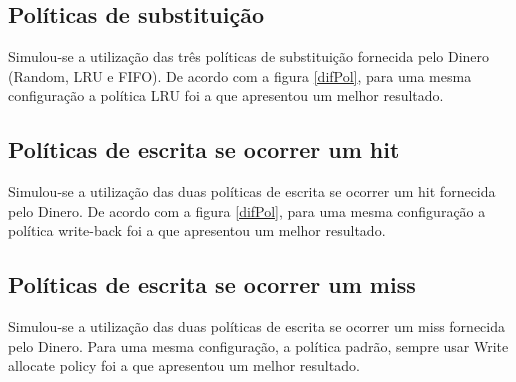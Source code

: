 \documentclass[12pt,a4paper]{article}
\begin{document}



\subsection{Políticas de substituição}
Simulou-se a utilização das três políticas de substituição fornecida
pelo Dinero (Random, LRU e FIFO).
De acordo com a figura \ref{difPol}, para uma mesma configuração a política LRU foi a que apresentou um
melhor resultado.



\subsection{Políticas de escrita se ocorrer um hit}
Simulou-se a utilização das duas políticas de escrita se ocorrer um
hit fornecida pelo Dinero.
De acordo com a figura \ref{difPol}, para uma mesma configuração a política write-back foi a que apresentou um
melhor resultado.

\subsection{Políticas de escrita se ocorrer um miss}
Simulou-se a utilização das duas políticas de escrita se ocorrer um
miss fornecida pelo Dinero.
Para uma mesma configuração, a política padrão, sempre usar Write allocate policy foi a que apresentou um
melhor resultado.
\end{document}
